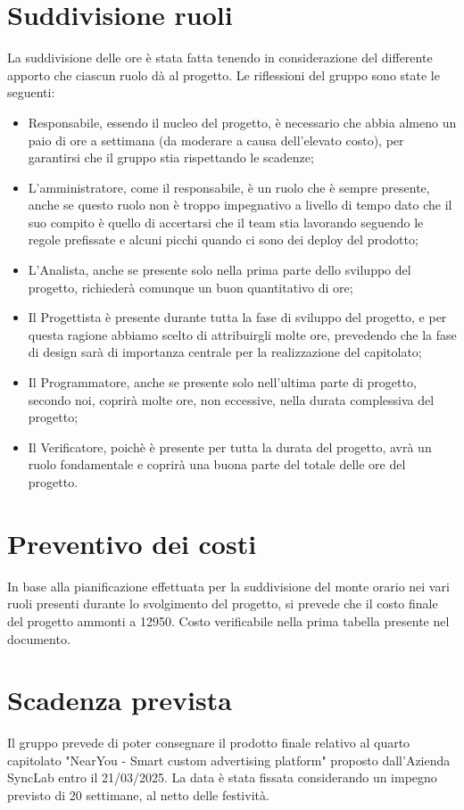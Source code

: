 \documentclass[10pt]{article}
\begin{document}
\section{Suddivisione ruoli}
La suddivisione delle ore è stata fatta tenendo in considerazione del differente apporto che ciascun ruolo dà al progetto. Le riflessioni del gruppo sono state le seguenti:
\begin{itemize}
    \item Responsabile, essendo il nucleo del progetto, è necessario che abbia almeno un paio di ore a settimana (da moderare a causa dell'elevato costo), per garantirsi che il gruppo stia rispettando le scadenze;
    \item L'amministratore, come il responsabile, è un ruolo che è sempre presente, anche se questo ruolo non è troppo impegnativo a livello di tempo dato che il suo compito è quello di accertarsi che il team stia lavorando seguendo le regole prefissate e alcuni picchi quando ci sono dei deploy del prodotto;
    \item L'Analista, anche se presente solo nella prima parte dello sviluppo del progetto, richiederà comunque un buon quantitativo di ore;
    \item Il Progettista è presente durante tutta la fase di sviluppo del progetto, e per questa ragione abbiamo scelto di attribuirgli molte ore, prevedendo che la fase di design sarà di importanza centrale per la realizzazione del capitolato;
    \item Il Programmatore, anche se presente solo nell'ultima parte di progetto, secondo noi, coprirà molte ore, non eccessive, nella durata complessiva del progetto;
    \item Il Verificatore, poichè è presente per tutta la durata del progetto, avrà un ruolo fondamentale e coprirà una buona parte del totale delle ore del progetto.
\end{itemize}


\section{Preventivo dei costi}
In base alla pianificazione effettuata per la suddivisione del monte orario nei vari ruoli presenti durante lo svolgimento del progetto, si prevede che il costo finale del progetto ammonti a 12950\texteuro . Costo verificabile nella prima tabella presente nel documento.
\section{Scadenza prevista}
Il gruppo prevede di poter consegnare il prodotto finale relativo al quarto capitolato "NearYou - Smart custom advertising platform" proposto dall'Azienda SyncLab entro il 21/03/2025. La data è stata fissata considerando un impegno previsto di 20 settimane, al netto delle festività.
\end{document}
